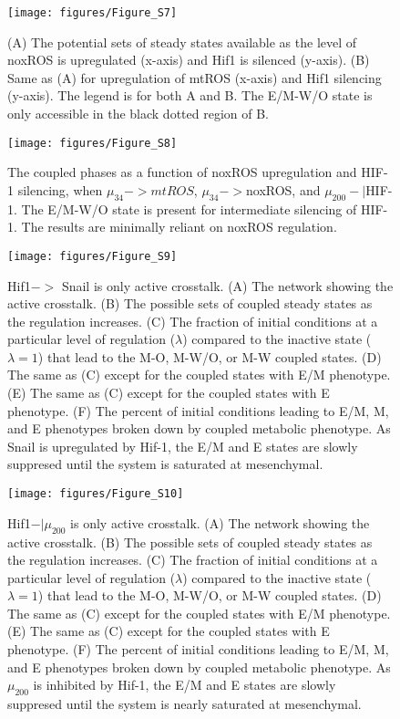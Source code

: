 \documentclass{article}
\begin{document}
\begin{figure}
\texttt{[image: figures/Figure\_S7]}
\caption{(A) The potential sets of steady states available as the level of noxROS is upregulated (x-axis) and Hif1 is silenced (y-axis). (B) Same as (A) for upregulation of mtROS (x-axis) and Hif1 silencing (y-axis). The legend is for both A and B. The E/M-W/O state is only accessible in the black dotted region of B. }
\end{figure} 


\begin{figure}
\texttt{[image: figures/Figure\_S8]}
\caption{The coupled phases as a function of noxROS upregulation and HIF-1 silencing, when $\mu_{34}->mtROS$, $\mu_{34}->$noxROS, and $\mu_{200}-| $HIF-1. The E/M-W/O state is present for intermediate silencing of HIF-1. The results are minimally reliant on noxROS regulation.}
\end{figure}



\begin{figure}
\texttt{[image: figures/Figure\_S9]}
\caption{Hif1$->$ Snail is only active crosstalk. (A) The network showing the active crosstalk. (B) The possible sets of coupled steady states as the regulation increases. (C) The fraction of initial conditions at a particular level of regulation ($\lambda$) compared to the inactive state ($\lambda=1$) that lead to the M-O, M-W/O, or M-W coupled states. (D) The same as (C) except for the coupled states with E/M phenotype. (E) The same as (C) except for the coupled states with E phenotype. (F) The percent of initial conditions leading to E/M, M, and E phenotypes broken down by coupled metabolic phenotype. As Snail is upregulated by Hif-1, the E/M and E states are slowly suppresed until the system is saturated at mesenchymal. }
\end{figure}

\begin{figure}
\texttt{[image: figures/Figure\_S10]}
\caption{Hif1$-| \mu_{200}$ is only active crosstalk. (A) The network showing the active crosstalk. (B) The possible sets of coupled steady states as the regulation increases. (C) The fraction of initial conditions at a particular level of regulation ($\lambda$) compared to the inactive state ($\lambda=1$) that lead to the M-O, M-W/O, or M-W coupled states. (D) The same as (C) except for the coupled states with E/M phenotype. (E) The same as (C) except for the coupled states with E phenotype. (F) The percent of initial conditions leading to E/M, M, and E phenotypes broken down by coupled metabolic phenotype. As $\mu_{200}$ is inhibited by Hif-1, the E/M and E states are slowly suppresed until the system is nearly saturated at mesenchymal. }
\end{figure}
\end{document}
